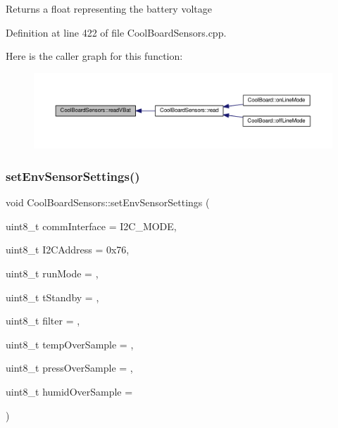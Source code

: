 \begin{DoxyReturn}{Returns}
a float representing the battery voltage 
\end{DoxyReturn}


Definition at line 422 of file Cool\+Board\+Sensors.\+cpp.

Here is the caller graph for this function\+:\nopagebreak
\begin{figure}[H]
\begin{center}
\leavevmode
\includegraphics[width=350pt]{class_cool_board_sensors_a6944b6ea7bce8e2fce1b434acfd9d5f3_icgraph}
\end{center}
\end{figure}
\mbox{\label{class_cool_board_sensors_a406307ffd70272282d91479c7ed8d66f}} 
\subsubsection{\texorpdfstring{set\+Env\+Sensor\+Settings()}{setEnvSensorSettings()}}
{\footnotesize\ttfamily void Cool\+Board\+Sensors\+::set\+Env\+Sensor\+Settings (\begin{DoxyParamCaption}\item[{uint8\+\_\+t}]{comm\+Interface = {\ttfamily I2C\+\_\+MODE},  }\item[{uint8\+\_\+t}]{I2\+C\+Address = {\ttfamily 0x76},  }\item[{uint8\+\_\+t}]{run\+Mode = {},  }\item[{uint8\+\_\+t}]{t\+Standby = {},  }\item[{uint8\+\_\+t}]{filter = {},  }\item[{uint8\+\_\+t}]{temp\+Over\+Sample = {},  }\item[{uint8\+\_\+t}]{press\+Over\+Sample = {},  }\item[{uint8\+\_\+t}]{humid\+Over\+Sample = {} }\end{DoxyParamCaption})}


